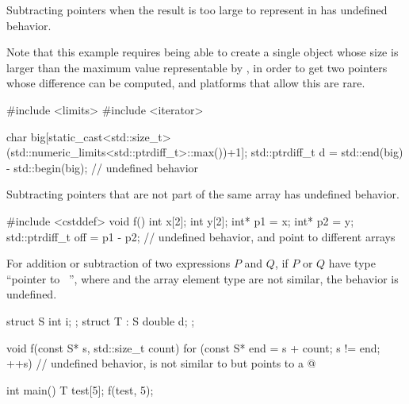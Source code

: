 
\pnum
Subtracting pointers
when the result is too large
to represent in 
has undefined behavior.

\pnum
\begin{example}
Note that this example
requires being able to create a single object
whose size is larger than
the maximum value
representable by
,
in order to get
two pointers
whose difference can be computed,
and platforms that allow this
are rare.
\begin{codeblock}
#include <limits>
#include <iterator>

char big[static_cast<std::size_t>(std::numeric_limits<std::ptrdiff_t>::max())+1];
std::ptrdiff_t d = std::end(big) - std::begin(big);     // undefined behavior
\end{codeblock}
\end{example}


\pnum
Subtracting pointers that are not part of the same array
has undefined behavior.

\pnum
\begin{example}
\begin{codeblock}
#include <cstddef>
void f() {
  int x[2];
  int y[2];
  int* p1 = x;
  int* p2 = y;
  std::ptrdiff_t off = p1 - p2; // undefined behavior,  and  point to different arrays
}
\end{codeblock}
\end{example}


\pnum
For addition or subtraction of two expressions $P$ and $Q$,
if $P$ or $Q$ have type ``pointer to \cv{}~'', where  and the array
element type are not similar, the behavior is undefined.

\pnum
\begin{example}
\begin{codeblock}
struct S     {  int i;    };
struct T : S {  double d; };

void f(const S* s, std::size_t count) {
  for (const S* end = s + count; s != end; ++s) {
        // undefined behavior,  is not similar to  but  points to a 
    @\commentellip@
  }
}

int main() {
  T test[5];
  f(test, 5);
}
\end{codeblock}
\end{example}


